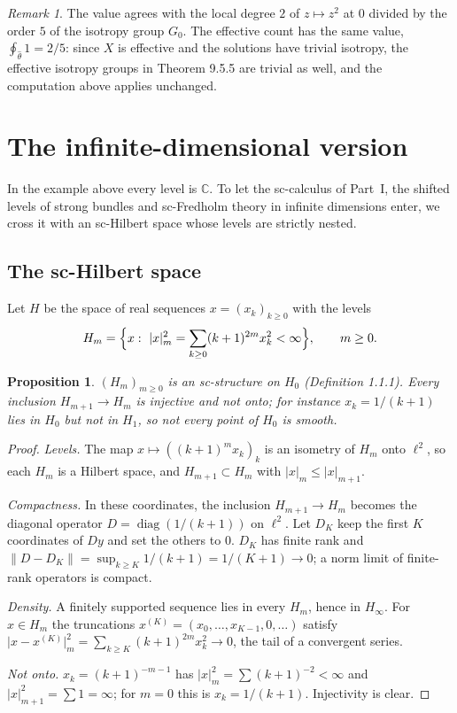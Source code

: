 \documentclass[11pt,a4paper]{article}
\theoremstyle{plain}
\newtheorem{proposition}[theorem]{Proposition}
\theoremstyle{definition}
\theoremstyle{remark}
\newtheorem{remark}[theorem]{Remark}
\newcommand{\C}{\mathbb{C}}
\newcommand{\abs}[1]{\lvert #1\rvert}
\begin{document}
\begin{remark}\label{rem:effective}
The value agrees with the local degree $2$ of $z\mapsto z^2$ at $0$ divided by the order $5$ of the
isotropy group $G_0$. The effective count has the same value, $\oint_{\hat\theta}1=2/5$: since $X$ is
effective and the solutions have trivial isotropy, the effective isotropy groups in Theorem 9.5.5 are
trivial as well, and the computation above applies unchanged.
\end{remark}

\section{The infinite-dimensional version}\label{sec:inf}

In the example above every level is $\C$. To let the sc-calculus of Part~I, the shifted levels of strong
bundles and sc-Fredholm theory in infinite dimensions enter, we cross it with an sc-Hilbert space whose
levels are strictly nested.

\subsection{The sc-Hilbert space}

Let $H$ be the space of real sequences $x=(x_k)_{k\ge0}$ with the levels
\[
  H_m=\Bigl\{x:\ \abs{x}_m^2=\sum_{k\ge0}(k+1)^{2m}x_k^2<\infty\Bigr\},\qquad m\ge0 .
\]

\begin{proposition}\label{prop:H}
$(H_m)_{m\ge0}$ is an sc-structure on $H_0$ (Definition 1.1.1). Every inclusion $H_{m+1}\to H_m$ is
injective and not onto; for instance $x_k=1/(k+1)$ lies in $H_0$ but not in $H_1$, so not every point of
$H_0$ is smooth.
\end{proposition}

\begin{proof}
\emph{Levels.} The map $x\mapsto((k+1)^mx_k)_k$ is an isometry of $H_m$ onto $\ell^2$, so each $H_m$ is a
Hilbert space, and $H_{m+1}\subset H_m$ with $\abs x_m\le\abs x_{m+1}$.

\emph{Compactness.} In these coordinates, the inclusion $H_{m+1}\to H_m$ becomes the diagonal operator
$D=\operatorname{diag}(1/(k+1))$ on $\ell^2$. Let $D_K$ keep the first $K$ coordinates of $Dy$ and set the
others to $0$. $D_K$ has finite rank and $\lVert D-D_K\rVert=\sup_{k\ge K}1/(k+1)=1/(K+1)\to0$; a norm
limit of finite-rank operators is compact.

\emph{Density.} A finitely supported sequence lies in every $H_m$, hence in $H_\infty$. For $x\in H_m$ the
truncations $x^{(K)}=(x_0,\dots,x_{K-1},0,\dots)$ satisfy
$\abs{x-x^{(K)}}_m^2=\sum_{k\ge K}(k+1)^{2m}x_k^2\to0$, the tail of a convergent series.

\emph{Not onto.} $x_k=(k+1)^{-m-1}$ has $\abs x_m^2=\sum(k+1)^{-2}<\infty$ and
$\abs x_{m+1}^2=\sum1=\infty$; for $m=0$ this is $x_k=1/(k+1)$. Injectivity is clear.
\end{proof}
\end{document}
